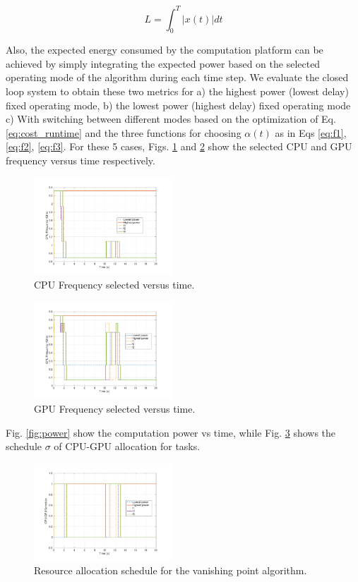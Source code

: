 \begin{equation}
L = \int_0^T |x(t)|dt
\label{eq:ControlPerf}
\end{equation}

Also, the expected energy consumed by the computation platform can be achieved by simply integrating the expected power based on the selected operating mode of the algorithm during each time step. We evaluate the closed loop system to obtain these two metrics for a) the highest power (lowest delay) fixed operating mode, b) the lowest power (highest delay) fixed operating mode c) With switching between different modes based on the optimization of Eq.\ref{eq:cost_runtime} and the three functions for choosing $\alpha(t)$ as in Eqs \ref{eq:f1}, \ref{eq:f2}, \ref{eq:f3}. For these 5 cases, Figs. \ref{fig:cpuf} and \ref{fig:gpuf} show the selected CPU and GPU frequency versus time respectively.  
\begin{figure}[hbtp]
\centering
\includegraphics[width=0.46\textwidth]{../simulations/figs/CPUF.pdf}
\caption{CPU Frequency selected versus time.}
\label{fig:cpuf} 
\end{figure}


\begin{figure}[hbtp]
\centering
\includegraphics[width=0.46\textwidth]{../simulations/figs/GPUF.pdf}
\caption{GPU Frequency selected versus time.}
\label{fig:gpuf} 
\end{figure}

Fig. \ref{fig:power} show the computation power vs time, while Fig. \ref{fig:schedule} shows the schedule $\sigma$ of CPU-GPU allocation for tasks.

\begin{figure}[hbtp]
\centering
\includegraphics[width=0.46\textwidth]{../simulations/figs/schedule.pdf}
\caption{Resource allocation schedule for the vanishing point algorithm.}
\label{fig:schedule} 
\end{figure}

